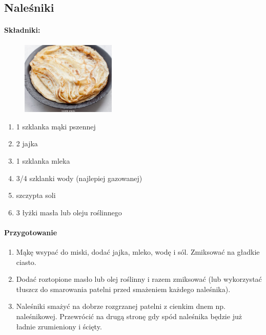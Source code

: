 \documentclass{article}
\begin{document}
    \subsection{Naleśniki}
    \bigskip
    \paragraph{Składniki:}
    \begin{figure}
        \includegraphics[width=0.4\textwidth]{nalesniki.jpg}
    \end{figure}
    \begin{enumerate}
        \item 1 szklanka mąki pszennej
        \item 2 jajka
        \item 1 szklanka mleka
        \item 3/4 szklanki wody (najlepiej gazowanej)
        \item szczypta soli
        \item 3 łyżki masła lub oleju roślinnego
    \end{enumerate}

    \paragraph{Przygotowanie}
    \begin{enumerate}
        \item Mąkę wsypać do miski, dodać jajka, mleko, wodę i sól. Zmiksować na
            gładkie ciasto.
        \item Dodać roztopione masło lub olej roślinny i razem zmiksować (lub
            wykorzystać tłuszcz do smarowania patelni przed smażeniem każdego
            naleśnika).
        \item Naleśniki smażyć na dobrze rozgrzanej patelni z cienkim dnem np.
            naleśnikowej. Przewrócić na drugą stronę gdy spód naleśnika będzie
            już ładnie zrumieniony i ścięty.
    \end{enumerate}
    \newpage
\end{document}
